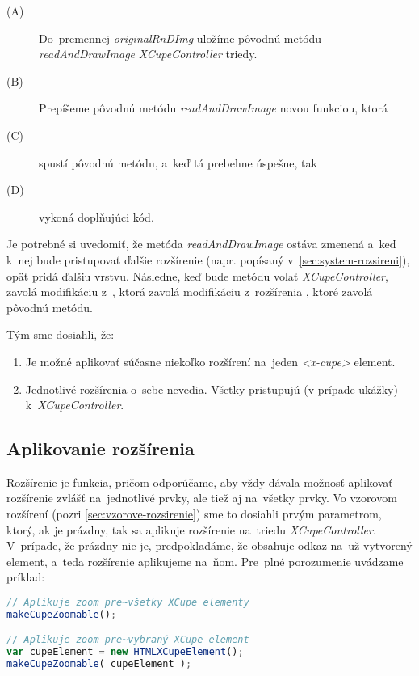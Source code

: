 \begin{description}
	\item [(A)] Do~premennej \emph{originalRnDImg} uložíme pôvodnú metódu \emph{readAndDrawImage} \emph{XCupeController} triedy. 
	\item [(B)] Prepíšeme pôvodnú metódu \emph{readAndDrawImage} novou funkciou, ktorá
	\item [(C)] spustí pôvodnú metódu, a~keď tá prebehne úspešne, tak
	\item [(D)] vykoná doplňujúci kód.
\end{description}

Je potrebné si uvedomiť, že metóda \emph{readAndDrawImage} ostáva zmenená a~keď k~nej bude pristupovať ďalšie rozšírenie (napr.  popísaný v~\ref{sec:system-rozsireni}), opäť pridá ďalšiu vrstvu. Následne, keď bude metódu volať \emph{XCupeController}, zavolá modifikáciu z~, ktorá zavolá modifikáciu z~rozšírenia , ktoré zavolá pôvodnú metódu.


Tým sme dosiahli, že:

\begin{enumerate}
	\item Je možné aplikovať súčasne niekoľko rozšírení na~jeden \emph{<x-cupe>} element.
	\item Jednotlivé rozšírenia o~sebe nevedia. Všetky pristupujú (v prípade ukážky) k~\emph{XCupeController}. 
\end{enumerate}


\subsection{Aplikovanie rozšírenia}

Rozšírenie je funkcia, pričom odporúčame, aby vždy dávala možnosť aplikovať rozšírenie zvlášť na~jednotlivé prvky, ale tiež aj na~všetky prvky. Vo vzorovom rozšírení  (pozri \ref{sec:vzorove-rozsirenie}) sme to dosiahli prvým parametrom, ktorý, ak je prázdny, tak sa aplikuje rozšírenie na~triedu \emph{XCupeController}. V~prípade, že prázdny nie je, predpokladáme, že obsahuje odkaz na~už vytvorený element, a~teda rozšírenie aplikujeme na~ňom. Pre~plné porozumenie uvádzame príklad:

\begin{lstlisting}[language=JavaScript]
// Aplikuje zoom pre~všetky XCupe elementy
makeCupeZoomable();

// Aplikuje zoom pre~vybraný XCupe element
var cupeElement = new HTMLXCupeElement();
makeCupeZoomable( cupeElement );
\end{lstlisting}


